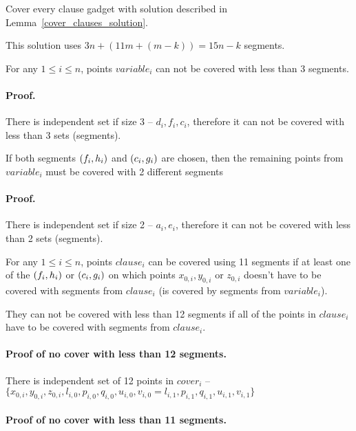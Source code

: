Cover every clause gadget with solution described in
Lemma~\ref{cover_clauses_solution}.

This solution uses $3n + (11m + (m-k)) = 15n - k$ segments.


\begin{lemma}
\label{choose_variables_no_less}
For any $1 \le i \le n$, points $variable_i$
can not be covered with less than 3 segments.
\end{lemma}

\paragraph{Proof.}
There is independent set if size 3 -- $d_i, f_i, c_i$, therefore it can
not be covered with less than 3 sets (segments).


\begin{lemma}
\label{choose_variables_both}
If both segments $(f_i, h_i)$ and $(c_i, g_i)$ are chosen, then
the remaining points from $variable_i$ must be covered with 2 different
segments
\end{lemma}
\paragraph{Proof.}
There is independent set if size 2 -- $a_i, e_i$, therefore it can
not be covered with less than 2 sets (segments).


\begin{lemma}
\label{cover_clauses_segments_no_less}
For any $1 \le i \le n$, points $clause_i$
can be covered using 11 segments if at least one of the $(f_i, h_i)$
or $(c_i, g_i)$ on which points $x_{0, i}, y_{0, i}$ or $z_{0, i}$
doesn't have to be covered with segments from $clause_i$ (is covered by
segments from $variable_i$).

They can not be covered with less than 12 segments if all of the points
in $clause_i$ have to be covered with segments from $clause_i$.
\end{lemma}


\paragraph{Proof of no cover with less than 12 segments.}
There is independent set of 12 points in $cover_i$ -- 
$\{ x_{0, i}, y_{0, i}, z_{0, i}, l_{i, 0}, p_{i, 0}, q_{i, 0}, u_{i, 0}, v_{i, 0} = l_{i, 1},
 p_{i, 1}, q_{i, 1}, u_{i, 1}, v_{i, 1} \}$

\paragraph{Proof of no cover with less than 11 segments.}

